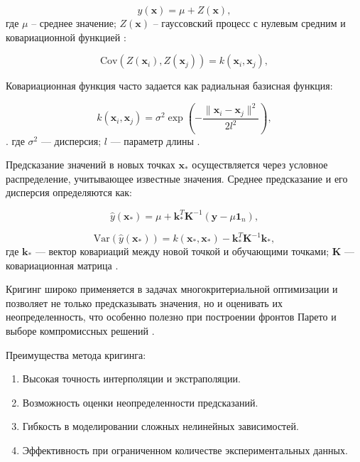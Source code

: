 \begin{equation}
	y(\mathbf{x}) = \mu + Z(\mathbf{x}),
\end{equation}
где $\mu$ -- среднее значение; $Z(\mathbf{x})$ -- гауссовский процесс с нулевым средним и
ковариационной функцией \cite{marrel2024probabilistic}:

\begin{equation}
	\text{Cov}(Z(\mathbf{x}_i), Z(\mathbf{x}_j)) = k(\mathbf{x}_i, \mathbf{x}_j),
\end{equation}

Ковариационная функция часто задается как радиальная базисная функция:

\begin{equation}
	k(\mathbf{x}_i, \mathbf{x}_j) = \sigma^2 \exp\left(-\frac{\|\mathbf{x}_i - \mathbf{x}_j\|^2}{2l^2}\right),
\end{equation}.
где \( \sigma^2 \) — дисперсия;
$l$ — параметр длины \cite{figueroa2021gaussian}.

Предсказание значений в новых точках $\mathbf{x}_*$ осуществляется через условное распределение, учитывающее известные значения.
Среднее предсказание и его дисперсия определяются как:

\begin{equation}
	\hat{y}(\mathbf{x}_*) = \mu + \mathbf{k}_*^T \mathbf{K}^{-1} (\mathbf{y} - \mu \mathbf{1}_n),
\end{equation}

\begin{equation}
	\text{Var}(\hat{y}(\mathbf{x}_*)) = k(\mathbf{x}_*, \mathbf{x}_*) - \mathbf{k}_*^T \mathbf{K}^{-1} \mathbf{k}_*,
\end{equation}
где $\mathbf{k}_*$ — вектор ковариаций между новой точкой и обучающими точками;
$\mathbf{K}$ — ковариационная матрица \cite{zhou2020enhanced}.

Кригинг широко применяется в задачах многокритериальной оптимизации и позволяет
не только предсказывать значения, но и оценивать их неопределенность, что особенно
полезно при построении фронтов Парето и выборе компромиссных решений \cite{radaideh2020surrogate}.

Преимущества метода кригинга:

\begin{enumerate}
	\item Высокая точность интерполяции и экстраполяции.
	\item Возможность оценки неопределенности предсказаний.
	\item Гибкость в моделировании сложных нелинейных зависимостей.
	\item Эффективность при ограниченном количестве экспериментальных данных.
\end{enumerate}

